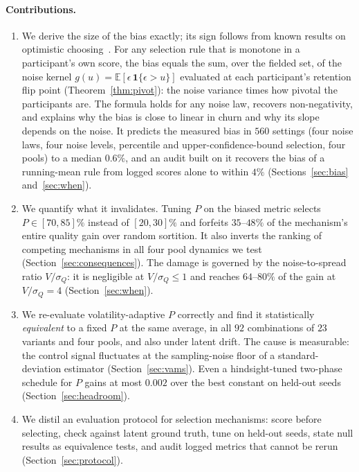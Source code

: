 \documentclass[sigconf,anonymous,review,nonacm]{acmart}
\begin{document}
\paragraph{Contributions.}
\begin{enumerate}
\item We derive the size of the bias exactly; its sign follows from known results on
optimistic choosing~\cite{shin2019bias}. For any selection rule that is monotone in a
participant's own score, the bias equals the sum, over the fielded set, of the noise kernel
$g(u)=\mathbb E[\epsilon\,\mathbf 1\{\epsilon>u\}]$ evaluated at each participant's
retention flip point (Theorem~\ref{thm:pivot}): the noise variance times how pivotal the
participants are. The formula holds for any noise law, recovers non-negativity, and
explains why the bias is close to linear in churn and why its slope depends on the noise.
It predicts the measured bias in $560$ settings (four noise laws, four noise levels,
percentile and upper-confidence-bound selection, four pools) to a median $0.6\%$, and an
audit built on it recovers the bias of a running-mean rule from logged scores alone to
within $4\%$ (Sections~\ref{sec:bias} and~\ref{sec:when}).
\item We quantify what it invalidates. Tuning $P$ on the biased metric selects
$P\in[70,85]\%$ instead of $[20,30]\%$ and forfeits $35$--$48\%$ of the mechanism's entire
quality gain over random sortition. It also inverts the ranking of competing mechanisms in
all four pool dynamics we test (Section~\ref{sec:consequences}). The damage is governed by
the noise-to-spread ratio $V/\sigma_Q$: it is negligible at $V/\sigma_Q\le1$ and reaches
$64$--$80\%$ of the gain at $V/\sigma_Q=4$ (Section~\ref{sec:when}).
\item We re-evaluate volatility-adaptive $P$ correctly and find it statistically
\emph{equivalent} to a fixed $P$ at the same average, in all $92$ combinations of $23$
variants and four pools, and also under latent drift. The cause is measurable: the control
signal fluctuates at the sampling-noise floor of a standard-deviation estimator
(Section~\ref{sec:vams}). Even a hindsight-tuned two-phase schedule for $P$ gains at
most $0.002$ over the best constant on held-out seeds (Section~\ref{sec:headroom}).
\item We distil an evaluation protocol for selection mechanisms: score before selecting,
check against latent ground truth, tune on held-out seeds, state null results as
equivalence tests, and audit logged metrics that cannot be rerun
(Section~\ref{sec:protocol}).
\end{enumerate}
\end{document}
